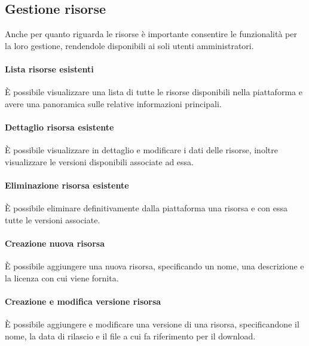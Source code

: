 \subsection{Gestione risorse}
Anche per quanto riguarda le risorse è importante consentire le funzionalità per
la loro gestione, rendendole disponibili ai soli utenti amministratori.

\paragraph{Lista risorse esistenti}
È possibile visualizzare una lista di tutte le risorse disponibili nella
piattaforma e avere una panoramica sulle relative informazioni principali.

\paragraph{Dettaglio risorsa esistente}
È possibile visualizzare in dettaglio e modificare i dati delle risorse, inoltre
visualizzare le versioni disponibili associate ad essa.

\paragraph{Eliminazione risorsa esistente}
È possibile eliminare definitivamente dalla piattaforma una risorsa e con essa
tutte le versioni associate.

\paragraph{Creazione nuova risorsa}
È possibile aggiungere una nuova risorsa, specificando un nome, una descrizione
e la licenza con cui viene fornita.

\paragraph{Creazione e modifica versione risorsa}
È possibile aggiungere e modificare una versione di una risorsa, specificandone
il nome, la data di rilascio e il file a cui fa riferimento per il download.